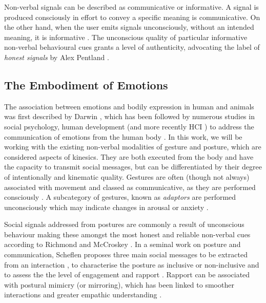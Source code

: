 Non-verbal signals can be described as communicative or informative. A signal is produced consciously in effort to convey a specific meaning is communicative. On the other hand, when the user emits signals unconsciously, without an intended meaning, it is informative \cite{vinciarelli_towards_2011}. The unconscious quality of particular informative non-verbal behavioural cues grants a level of authenticity, advocating the label of \textit{honest signals} by Alex Pentland \cite{pentland_honest_2010}.

\subsection{The Embodiment of Emotions}

The association between emotions and bodily expression in human and animals was first described by Darwin \cite{darwin_expression_2013}, which has been followed by numerous studies in social psychology, human development (and more recently HCI \cite{alaoui_movement_2012, gillies_creating_2018, fdili_alaoui_strategies_2015}) to address the communication of emotions from the human body \cite{gunes_lab_2008}. In this work, we will be working with the existing non-verbal modalities of gesture and posture, which are considered aspects of kinesics. They are both executed from the body and have the capacity to transmit social messages, but can be differentiated by their degree of intentionally and kinematic quality. Gestures are often (though not always) associated with movement and classed as communicative, as they are performed consciously \cite{vinciarelli_towards_2011}. A subcategory of gestures, known as \textit{adaptors} are performed unconsciously which may indicate changes in arousal or anxiety \cite{hans_kinesics_2015, neff_dont_2011}.

Social signals addressed from postures are commonly a result of unconscious behaviour making these amongst the most honest and reliable non-verbal cues according to Richmond and McCroskey \cite{richmond_nonverbal_2011}. In a seminal work on posture and communication, Scheflen proposes three main social messages to be extracted from an interaction \cite{scheflen_significance_1964}, to characterise the posture as inclusive or non-inclusive and to assess the the level of engagement and rapport \cite{vinciarelli_social_2009}. Rapport can be associated with postural mimicry (or mirroring), which has been linked to smoother interactions and greater empathic understanding \cite{chartrand_chameleon_1999}.

